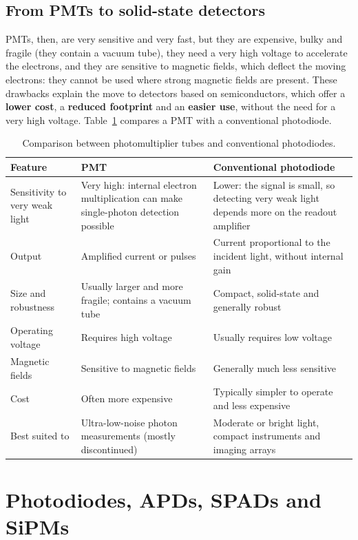\documentclass[letterpaper,11pt,leqno]{book}
\begin{document}
\subsection{From PMTs to solid-state detectors}

PMTs, then, are very sensitive and very fast, but they are expensive, bulky and fragile (they contain a vacuum tube), they need a very high voltage to accelerate the electrons, and they are sensitive to magnetic fields, which deflect the moving electrons: they cannot be used where strong magnetic fields are present. These drawbacks explain the move to detectors based on semiconductors, which offer a \textbf{lower cost}, a \textbf{reduced footprint} and an \textbf{easier use}, without the need for a very high voltage. Table~\ref{tab:pmt_vs_photodiode} compares a PMT with a conventional photodiode.

\begin{table}[!htbp]
\centering
\caption{Comparison between photomultiplier tubes and conventional photodiodes.}
\label{tab:pmt_vs_photodiode}
\begin{tabular*}{\textwidth}{p{3.2cm}@{\extracolsep\fill}p{5.4cm}p{5.4cm}}
\toprule
Feature & PMT & Conventional photodiode \\
\midrule
Sensitivity to very weak light & Very high: internal electron multiplication can make single-photon detection possible & Lower: the signal is small, so detecting very weak light depends more on the readout amplifier \\
Output & Amplified current or pulses & Current proportional to the incident light, without internal gain \\
Size and robustness & Usually larger and more fragile; contains a vacuum tube & Compact, solid-state and generally robust \\
Operating voltage & Requires high voltage & Usually requires low voltage \\
Magnetic fields & Sensitive to magnetic fields & Generally much less sensitive \\
Cost & Often more expensive & Typically simpler to operate and less expensive \\
Best suited to & Ultra-low-noise photon measurements (mostly discontinued) & Moderate or bright light, compact instruments and imaging arrays \\
\bottomrule
\end{tabular*}
\end{table}

\section{Photodiodes, APDs, SPADs and SiPMs}
\label{sec:photodiodes}
\end{document}

